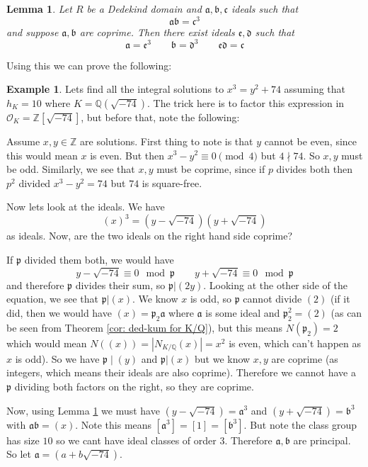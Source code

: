 \documentclass[11pt,a4paper]{report}
\theoremstyle{plain}
\newtheorem{lem}[subsection]{Lemma}
\theoremstyle{definition}
\newtheorem{exmp}[subsection]{Example}
\theoremstyle{definition}
\newcommand{\ZZ}{\mathbb{Z}}
\def\QQ{\mathbb{Q}}
\def\gothb{\mathfrak{b}}
\def\gothc{\mathfrak{c}}
\def\gothp{\mathfrak{p}}
\def \OO {\mathcal{O}}
\def\gotha{\mathfrak{a}}
\begin{document}
	
	
	\begin{lem}\label{lem: ideals mult to power}
		Let $R$ be a Dedekind domain and $\gotha,\gothb,\gothc$ ideals such that \[\gotha\gothb=\gothc^3\] and suppose $\gotha,\gothb$ are coprime. Then there exist ideals $\mathfrak{e},\mathfrak{d}$ such that \[\gotha=\mathfrak{e}^3 \qquad \gothb=\mathfrak{d}^3 \qquad \mathfrak{e}\mathfrak{d}=\gothc\] 
	\end{lem}
	
	
	
	Using this we can prove the following:
	
	\begin{exmp}
		Lets find all the integral solutions to $x^3=y^2+74$ assuming that $h_K=10$ where $K=\QQ(\sqrt{-74})$. The trick here is to factor this expression in $\OO_K=\ZZ[\sqrt{-74}]$, but before that, note the following: 
		
		Assume $x,y \in \ZZ$ are solutions. First thing to note is that $y$ cannot be even, since this would mean $x$ is even. But then $x^3 -y^2 \equiv 0 \pmod 4$ but $4\nmid 74$. So $x,y$ must be odd. Similarly, we see that $x,y$ must be coprime, since if $p$ divides both then $p^2$ divided $x^3-y^2=74$ but $74$ is square-free. 
		
		
		Now lets look at the ideals.  We have \[(x)^3=(y-\sqrt{-74})(y+\sqrt{-74})\] as ideals. Now, are the two ideals on the right hand side coprime?
		
		If $\gothp$ divided them both, we would have \[y-\sqrt{-74} \equiv 0 \mod \gothp \qquad y+\sqrt{-74} \equiv 0 \mod \gothp \] and therefore $\gothp$ divides their sum, so $\gothp| (2y)$. Looking at the other side of the equation, we see that $\gothp|(x)$. We know $x$ is odd, so $\gothp$ cannot divide $(2)$ (if it did, then we would have $(x)=\gothp_2 \gotha$ where $\gotha$ is some ideal and $\gothp_2^2=(2)$ (as can be seen from Theorem \ref{cor: ded-kum for K/Q}), but this means $N(\gothp_2)=2$ which would mean $N((x))=|N_{K/\QQ}(x)|=x^2$ is even, which can't happen as $x$ is odd). So we have $\gothp \mid (y)$ and $\gothp|(x)$ but we know $x,y$ are coprime (as integers, which means their ideals are also coprime). Therefore we cannot have a $\gothp$ dividing both factors on the right, so they are coprime. 
		
		
		
		
		Now, using Lemma \ref{lem: ideals mult to power} we must have $(y-\sqrt{-74})=\gotha^3$ and $(y+\sqrt{-74})=\gothb^3$ with $\gotha\gothb=(x)$. Note this means $[\gotha^3]=[1]=[\gothb^3]$. But note the class group has size $10$ so we cant have ideal classes of order $3$. Therefore $\gotha,\gothb$ are principal. So let $\gotha=(a+b\sqrt{-74})$.
		

\end{exmp}
\end{document}
